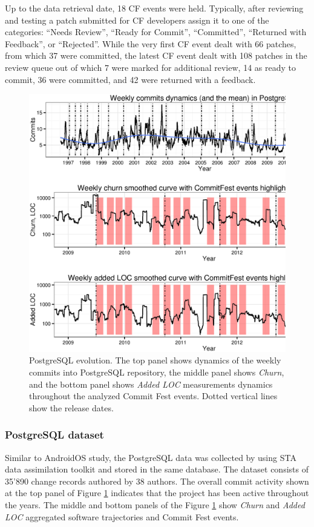 Up to the data retrieval date, 18 CF events were held. Typically, after reviewing and testing a patch submitted for CF developers assign it to one of the categories: ``Needs Review'', ``Ready for Commit'', ``Committed'', ``Returned with Feedback'', or ``Rejected''. While the very first CF event dealt with 66 patches, from which 37 were committed, the latest CF event dealt with 108 patches in the review queue out of which 7 were marked for additional review, 14 as ready to commit, 36 were committed, and 42 were returned with a feedback.

\begin{figure}[t!]
   \centering
   \includegraphics[width=150mm]{figures/postgre_commits_dynamics.eps}
   \caption{PostgreSQL evolution. The top panel shows dynamics of the weekly commits into PostgreSQL repository, the middle panel shows \textit{Churn}, and the bottom panel shows \textit{Added LOC} measurements dynamics throughout the analyzed Commit Fest events. Dotted vertical lines show the release dates.}
   \label{fig:postgre_dynamics}
\end{figure}

\subsubsection{PostgreSQL dataset}
Similar to AndroidOS study, the PostgreSQL data was collected by using STA data assimilation toolkit and stored in the same database. The dataset consists of 35'890 change records authored by 38 authors. The overall commit activity shown at the top panel of Figure \ref{fig:postgre_dynamics} indicates that the project has been active throughout the years. The middle and bottom panels of the Figure \ref{fig:postgre_dynamics} show \textit{Churn} and \textit{Added LOC} aggregated software trajectories and Commit Fest events.

